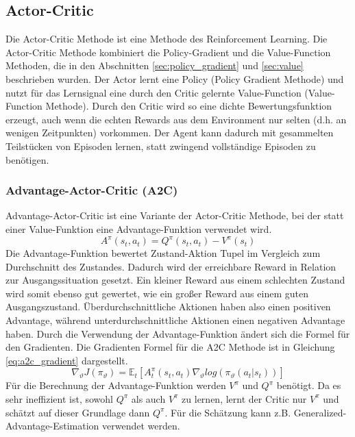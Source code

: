 \subsection{Actor-Critic}
Die Actor-Critic Methode ist eine Methode des Reinforcement Learning. Die Actor-Critic Methode kombiniert die Policy-Gradient und die Value-Function Methoden, die in den Abschnitten \ref{sec:policy_gradient} und \ref{sec:value} beschrieben wurden. Der Actor lernt eine Policy (Policy Gradient Methode) und nutzt für das Lernsignal eine durch den Critic gelernte Value-Function (Value-Function Methode). Durch den Critic wird so eine dichte Bewertungsfunktion erzeugt, auch wenn die echten Rewards aus dem Environment nur selten (d.h. an wenigen Zeitpunkten) vorkommen. Der Agent kann dadurch mit gesammelten Teilstücken von Episoden lernen, statt zwingend vollständige Episoden zu benötigen. 

\subsubsection{Advantage-Actor-Critic (A2C)}
Advantage-Actor-Critic ist eine Variante der Actor-Critic Methode, bei der statt einer Value-Funktion eine Advantage-Funktion verwendet wird.
\begin{equation}
    A^\pi(s_t,a_t) = Q^\pi(s_t,a_t) - V^\pi(s_t)
    \label{eq:advantage_function}
\end{equation}
Die Advantage-Funktion bewertet Zustand-Aktion Tupel im Vergleich zum Durchschnitt des Zustandes. Dadurch wird der erreichbare Reward in Relation zur Ausgangssituation gesetzt. Ein kleiner Reward aus einem schlechten Zustand wird somit ebenso gut gewertet, wie ein großer Reward aus einem guten Ausgangszustand. Überdurchschnittliche Aktionen haben also einen positiven Advantage, während unterdurchschnittliche Aktionen einen negativen Advantage haben.
Durch die Verwendung der Advantage-Funktion ändert sich die Formel für den Gradienten. Die Gradienten Formel für die A2C Methode ist in Gleichung \ref{eq:a2c_gradient} dargestellt.
\begin{equation}
    \nabla_\vartheta J(\pi_\vartheta) = \mathbb{E}_t\left[ A_t^\pi (s_t,a_t) \nabla_\vartheta log(\pi_\vartheta(a_t\vert s_t))\right]
    \label{eq:a2c_gradient}
\end{equation}
Für die Berechnung der Advantage-Funktion werden $V^\pi$ und $Q^\pi$ benötigt. Da es sehr ineffizient ist, sowohl $Q^\pi$ als auch $V^\pi$ zu lernen, lernt der Critic nur $V^\pi$ und schätzt auf dieser Grundlage dann $Q^\pi$. Für die Schätzung kann z.B. Generalized-Advantage-Estimation verwendet werden. \cite{FoundationsDeepRL}

